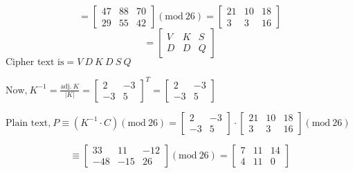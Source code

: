 \documentclass[a4paper,12pt]{article}
\begin{document}
        $$ = \begin{bmatrix}
            47 & 88 & 70 \\
            29 & 55 & 42
        \end{bmatrix}(\mbox{mod}\ 26) = \begin{bmatrix}
            21 & 10 & 18 \\
            3 & 3 & 16
        \end{bmatrix}$$
        $$ = \begin{bmatrix}
            V & K & S \\
            D & D & Q
        \end{bmatrix}$$
        $\mbox{Cipher text is} = V\ D\ K\ D\ S\ Q$

        \vspace*{1cm}

        $\mbox{Now,}\ K^{-1} = \frac{\mbox{adj.}\ K}{|K|} = \begin{bmatrix}
            2 & -3 \\
            -3 & 5
        \end{bmatrix}^{T} = \begin{bmatrix}
            2 & -3 \\
            -3 & 5
        \end{bmatrix}$
        \vspace*{0.5cm}

        $\mbox{Plain text,}\ P \equiv (K^{-1}\cdot C)(\mbox{mod}\ 26) = \begin{bmatrix}
            2 & -3 \\
            -3 & 5
        \end{bmatrix}\cdot \begin{bmatrix}
            21 & 10 & 18 \\
            3 & 3 & 16
        \end{bmatrix}(\mbox{mod}\ 26)$

        \vspace*{0.5cm}

        $$ \equiv \begin{bmatrix}
            33 & 11 & -12 \\
            -48 & -15 & 26
        \end{bmatrix}(\mbox{mod}\ 26) = \begin{bmatrix}
            7 & 11 & 14 \\
            4 & 11 & 0
        \end{bmatrix}$$

        \vspace*{0.5cm}
\end{document}
